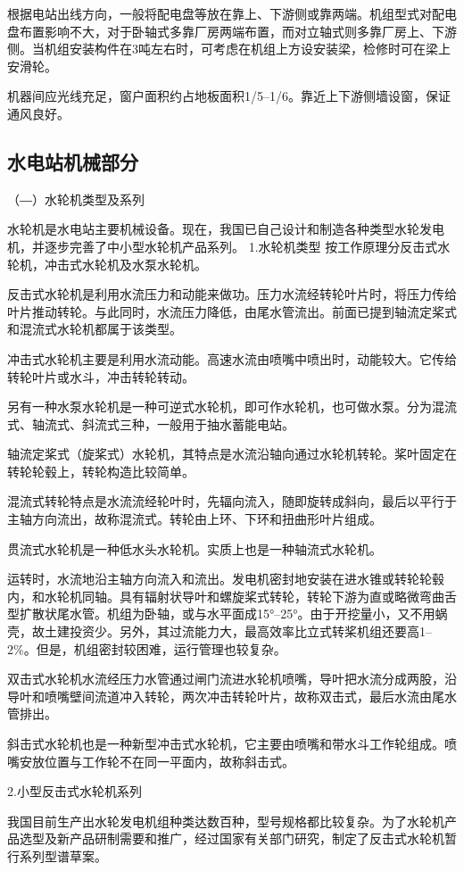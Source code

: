 \documentclass{ctexbook}
\begin{document}
根据电站出线方向，一般将配电盘等放在靠上、下游侧或靠两端。机组型式对配电盘布置影响不大，对于卧轴式多靠厂房两端布置，而对立轴式则多靠厂房上、下游侧。当机组安装构件在3吨左右时，可考虑在机组上方设安装梁，检修时可在梁上安滑轮。

机器间应光线充足，窗户面积约占地板面积1/5--1/6。靠近上下游侧墙设窗，保证通风良好。

\subsection{水电站机械部分}
（―）水轮机类型及系列

水轮机是水电站主要机械设备。现在，我国已自己设计和制造各种类型水轮发电机，并逐步完善了中小型水轮机产品系列。
1.水轮机类型
按工作原理分反击式水轮机，冲击式水轮机及水泵水轮机。

反击式水轮机是利用水流压力和动能来做功。压力水流经转轮叶片时，将压力传给叶片推动转轮。与此同时，水流压力降低，由尾水管流出。前面已提到轴流定桨式和混流式水轮机都属于该类型。

冲击式水轮机主要是利用水流动能。高速水流由喷嘴中喷出时，动能较大。它传给转轮叶片或水斗，冲击转轮转动。

另有一种水泵水轮机是一种可逆式水轮机，即可作水轮机，也可做水泵。分为混流式、轴流式、斜流式三种，一般用于抽水蓄能电站。

轴流定桨式（旋桨式）水轮机，其特点是水流沿轴向通过水轮机转轮。桨叶固定在转轮轮毂上，转轮构造比较简单。

混流式转轮特点是水流流经轮叶时，先辐向流入，随即旋转成斜向，最后以平行于主轴方向流出，故称混流式。转轮由上环、下环和扭曲形叶片组成。

贯流式水轮机是一种低水头水轮机。实质上也是一种轴流式水轮机。

运转时，水流地沿主轴方向流入和流出。发电机密封地安装在进水锥或转轮轮毂内，和水轮机同轴。具有辐射状导叶和螺旋桨式转轮，转轮下游为直或略微弯曲舌型扩散状尾水管。机组为卧轴，或与水平面成15°--25°。由于开挖量小，又不用蜗壳，故土建投资少。另外，其过流能力大，最高效率比立式转桨机组还要高1--2\%。但是，机组密封较困难，运行管理也较复杂。

双击式水轮机水流经压力水管通过闸门流进水轮机喷嘴，导叶把水流分成两股，沿导叶和喷嘴壁间流道冲入转轮，两次冲击转轮叶片，故称双击式，最后水流由尾水管排出。

斜击式水轮机也是一种新型冲击式水轮机，它主要由喷嘴和带水斗工作轮组成。喷嘴安放位置与工作轮不在同一平面内，故称斜击式。

2.小型反击式水轮机系列

我国目前生产出水轮发电机组种类达数百种，型号规格都比较复杂。为了水轮机产品选型及新产品研制需要和推广，经过国家有关部门研究，制定了反击式水轮机暂行系列型谱草案。
\end{document}
